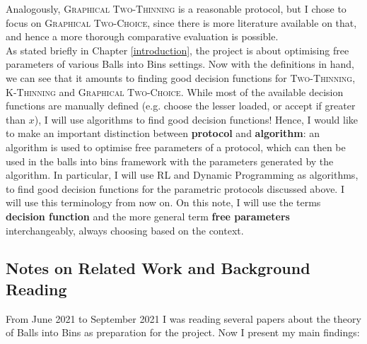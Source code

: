 Analogously, \textsc{Graphical Two-Thinning} is a reasonable protocol, but I chose to focus on \textsc{Graphical Two-Choice}, since there is more literature available on that, and hence a more thorough comparative evaluation is possible.\\


As stated briefly in Chapter \ref{introduction}, the project is about optimising free parameters of various Balls into Bins settings. Now with the definitions in hand, we can see that it amounts to finding good decision functions for \textsc{Two-Thinning}, \textsc{K-Thinning} and \textsc{Graphical Two-Choice}. While most of the available decision functions are manually defined (e.g. choose the lesser loaded, or accept if greater than $x$), I will use algorithms to find good decision functions! Hence, I would like to make an important distinction between \textbf{protocol} and \textbf{algorithm}: an algorithm is used to optimise free parameters of a protocol, which can then be used in the balls into bins framework with the parameters generated by the algorithm. In particular, I will use RL and Dynamic Programming as algorithms, to find good decision functions for the parametric protocols discussed above. I will use this terminology from now on. On this note, I will use the terms \textbf{decision function} and the more general term \textbf{free parameters} interchangeably, always choosing based on the context. 


\subsection{Notes on Related Work and Background Reading}


From June 2021 to September 2021 I was reading several papers about the theory of Balls into Bins as preparation for the project. Now I present my main findings: 


